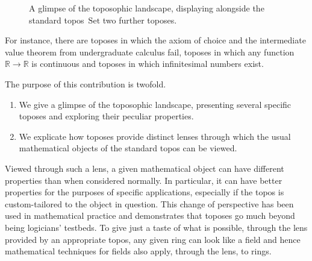 \documentclass[oneside,reqno]{amsart}
\theoremstyle{definition}
\theoremstyle{plain}
\theoremstyle{remark}
\newcommand{\RR}{\mathbb{R}}
\newcommand{\Set}{\mathrm{Set}}
\renewcommand{\_}{\mathpunct{.}\,}
\newcommand{\?}{\,{:}\,}
\begin{document}
\begin{figure}

  \caption{\label{fig:landscape}A glimpse of the toposophic landscape,
  displaying alongside the standard topos~$\Set$ two further toposes.}
\end{figure}


For instance, there are toposes in which the axiom of choice and the
intermediate value theorem from undergraduate calculus fail, toposes in which
any function~$\RR \to \RR$ is continuous and toposes in which infinitesimal
numbers exist.

The purpose of this contribution is twofold.
\begin{enumerate}
\item We give a glimpse of the toposophic landscape, presenting several
specific toposes and exploring their peculiar properties.

\item We explicate how toposes provide distinct lenses through which the
usual mathematical objects of the standard topos can be viewed.
\end{enumerate}

Viewed through such a lens, a given mathematical object can have different
properties than when considered normally. In particular, it can have
better properties for the purposes of specific applications, especially if
the topos is custom-tailored to the object in question. This change of
perspective has been used in mathematical practice and demonstrates that
toposes go much beyond being logicians' testbeds. To give just a taste of what
is possible, through the lens provided by an appropriate topos, any given ring
can look like a field and hence mathematical techniques for fields also apply,
through the lens, to rings.
\end{document}
